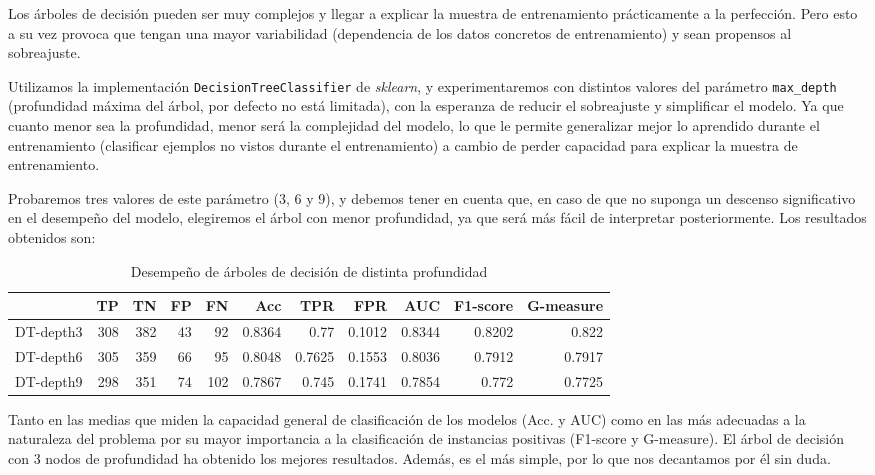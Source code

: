 \documentclass{article}
\begin{document}
  Los árboles de decisión pueden ser muy complejos y llegar a explicar
  la muestra de entrenamiento prácticamente a la perfección. Pero esto
  a su vez provoca que tengan una mayor variabilidad (dependencia de
  los datos concretos de entrenamiento) y sean propensos al
  sobreajuste.

  Utilizamos la implementación \texttt{DecisionTreeClassifier} de
  \textit{sklearn}, y experimentaremos con distintos valores del
  parámetro \texttt{max\_depth} (profundidad máxima del árbol, por
  defecto no está limitada), con la esperanza de reducir el
  sobreajuste y simplificar el modelo. Ya que cuanto menor sea la
  profundidad, menor será la complejidad del modelo, lo que le permite
  generalizar mejor lo aprendido durante el entrenamiento (clasificar
  ejemplos no vistos durante el entrenamiento) a cambio de perder
  capacidad para explicar la muestra de entrenamiento.

  Probaremos tres valores de este parámetro (3, 6 y 9), y debemos
  tener en cuenta que, en caso de que no suponga un descenso
  significativo en el desempeño del modelo, elegiremos el árbol con
  menor profundidad, ya que será más fácil de interpretar
  posteriormente. Los resultados obtenidos son:

\begin{table}[H]
\centering
\caption{Desempeño de árboles de decisión de distinta profundidad}
\label{tab:tuning-dt}
\begin{tabular}{|lrrrrrrrrrr|}
\hline
 & TP & TN & FP & FN & Acc & TPR & FPR & AUC & F1-score & G-measure\\ \hline
DT-depth3 & 308 & 382 & 43 & 92 & 0.8364 & 0.77 & 0.1012 & 0.8344 & 0.8202 & 0.822\\
DT-depth6 & 305 & 359 & 66 & 95 & 0.8048 & 0.7625 & 0.1553 & 0.8036 & 0.7912 & 0.7917\\
DT-depth9 & 298 & 351 & 74 & 102 & 0.7867 & 0.745 & 0.1741 & 0.7854 & 0.772 & 0.7725\\
\hline
\end{tabular}
\end{table}

Tanto en las medias que miden la capacidad general de clasificación de
los modelos (Acc. y AUC) como en las más adecuadas a la naturaleza del
problema por su mayor importancia a la clasificación de instancias
positivas (F1-score y G-measure). El árbol de decisión con 3 nodos de
profundidad ha obtenido los mejores resultados. Además, es el más
simple, por lo que nos decantamos por él sin duda.
\end{document}
